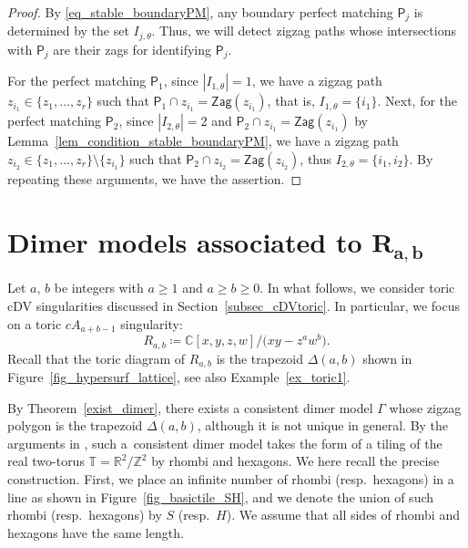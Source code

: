 \documentclass[10pt,a4paper]{amsart}
\numberwithin{equation}{section}
\theoremstyle{definition}
\newcommand{\ZZ}{\mathbb{Z}}
\newcommand{\RR}{\mathbb{R}}
\newcommand{\CC}{\mathbb{C}}
\newcommand{\TT}{\mathbb{T}}
\newcommand{\sfP}{\mathsf{P}}
\newcommand{\Zag}{\mathsf{Zag}}
\begin{document}
\begin{proof}
By \eqref{eq_stable_boundaryPM}, any boundary perfect matching $\sfP_j$ is determined by the set $I_{j,\theta}$.
Thus, we will detect zigzag paths whose intersections with $\sfP_j$ are their zags for identifying $\sfP_j$.

For the perfect matching $\sfP_1$, since $|I_{1,\theta}|=1$, we have a zigzag path $z_{i_1}\in\{z_1,\dots,z_r\}$ such that $\sfP_1\cap z_{i_1}=\Zag(z_{i_1})$,
that is, $I_{1,\theta}=\{i_1\}$.
Next, for the perfect matching $\sfP_2$,
since $|I_{2,\theta}|=2$ and $\sfP_2\cap z_{i_1}=\Zag(z_{i_1})$ by Lemma~\ref{lem_condition_stable_boundaryPM},
we have a zigzag path $z_{i_2}\in\{z_1,\dots,z_r\}{\setminus}\{z_{i_1}\}$ such that $\sfP_2\cap z_{i_2}=\Zag(z_{i_2})$,
thus $I_{2,\theta}=\{i_1,i_2\}$.
By repeating these arguments, we have the assertion.
\end{proof}

\section[Dimer models associated to R\_{a,b}]{Dimer models associated to $\boldsymbol{R_{a,b}}$}
\label{sec_dimer_ab}

Let $a$, $b$ be integers with $a\ge 1$ and $a\ge b\ge0$.
In what follows, we consider toric cDV singularities discussed in Section~\ref{subsec_cDVtoric}.
In particular, we focus on a toric $cA_{a+b-1}$ singularity:
\[
R_{a,b}\coloneqq \CC[x,y,z,w]/\bigl(xy-z^aw^b\bigr).
\]
Recall that the toric diagram of $R_{a,b}$ is the trapezoid $\Delta(a,b)$ shown in Figure~\ref{fig_hypersurf_lattice},
see also Example~\ref{ex_toric1}.

By Theorem~\ref{exist_dimer}, there exists a consistent dimer model $\Gamma$ whose zigzag polygon is the trapezoid $\Delta(a,b)$,
although it is not unique in general.
By the arguments in \cite[Section~1.2]{Nag}, such a~consistent dimer model takes the form of a tiling of the real two-torus $\TT=\RR^2/\ZZ^2$
by rhombi and hexagons.
We here recall the precise construction.
First, we place an infinite number of rhombi (resp.\ hexagons) in a line as shown in Figure~\ref{fig_basictile_SH},
and we denote the union of such rhombi (resp.\ hexagons) by $S$ (resp.\ $H$). We assume that all sides of rhombi and hexagons have the same length.
\end{document}
